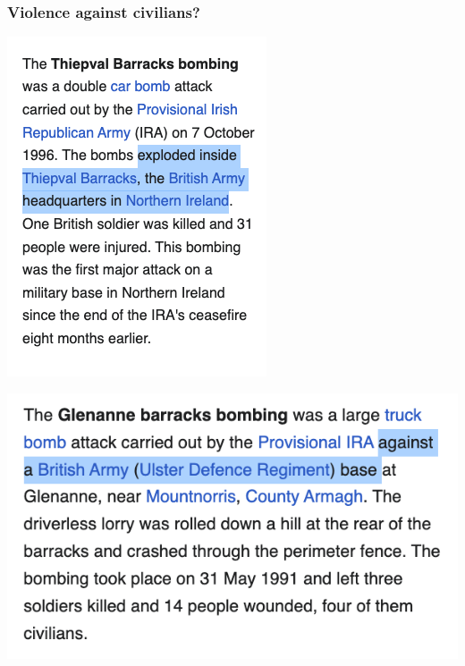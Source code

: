 \documentclass[aspectratio=43]{beamer}
\begin{document}
\begin{frame}
\frametitle{Violence against civilians?}
\centering

\begin{minipage}{.49\textwidth}\centering
  \includegraphics[width = \textwidth]{img/thiepval_wiki1}
\end{minipage}\hfill
\begin{minipage}{.49\textwidth}\centering
  \includegraphics[width = \textwidth]{img/glenanne_wiki}\\

\end{minipage}
\end{frame}
\end{document}
